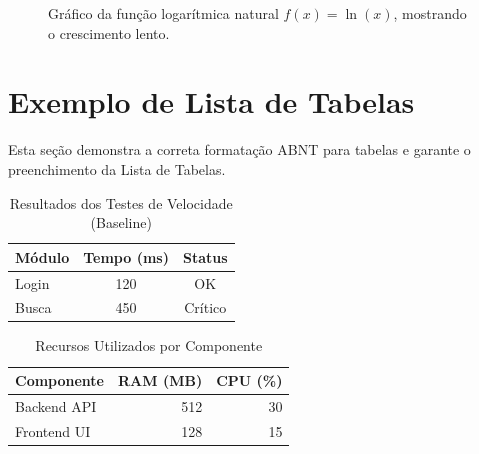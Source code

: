 \documentclass[
	12pt,				%
    oneside,            %
	a4paper,			%
	english,			%
	brazilian,		    %
	]{AcademicoUFT}
\begin{document}
\begin{figure}[H]
    \centering
    \caption{Gráfico da função logarítmica natural $f(x)=\ln(x)$, mostrando o crescimento lento.}
    \label{fig:funcao_logaritmica}
\end{figure}


\newpage %
\section{Exemplo de Lista de Tabelas}

\noindent Esta seção demonstra a correta formatação ABNT para tabelas e garante o preenchimento da Lista de Tabelas.

\begin{table}[H]
    \centering
    \caption{Resultados dos Testes de Velocidade (Baseline)}
    \label{tab:velocidade_baseline}
    \begin{tabular}{lcc}
        \toprule
        Módulo & Tempo (ms) & Status \\
        \midrule
        Login & 120 & OK \\
        Busca & 450 & Crítico \\
        \bottomrule
    \end{tabular}
\end{table}

\begin{table}[H]
    \centering
    \caption{Recursos Utilizados por Componente}
    \label{tab:recursos_comp}
    \begin{tabular}{lrr}
        \toprule
        Componente & RAM (MB) & CPU (\%) \\
        \midrule
        Backend API & 512 & 30 \\
        Frontend UI & 128 & 15 \\
        \bottomrule
    \end{tabular}
\end{table}
\end{document}
